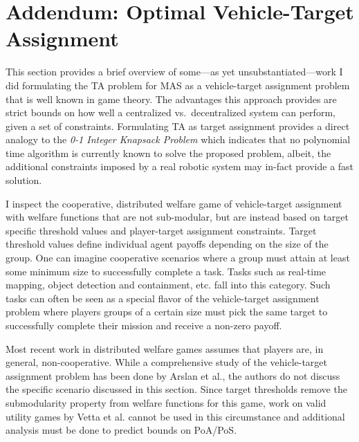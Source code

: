\documentclass[defaultstyle,12pt]{proposal}
\begin{document}
\chapter{\textbf{Addendum}: Optimal Vehicle-Target Assignment}
This section provides a brief overview of some---as yet unsubstantiated---work I did formulating the TA problem for MAS as a vehicle-target assignment problem that is well known in game theory. The advantages this approach provides are strict bounds on how well a centralized vs.~decentralized system can perform, given a set of constraints. Formulating TA as target assignment provides a direct analogy to the \emph{0-1 Integer Knapsack Problem} which indicates that no polynomial time algorithm is currently known to solve the proposed problem, albeit, the additional constraints imposed by a real robotic system may in-fact provide a fast solution.

I inspect the cooperative, distributed welfare game of vehicle-target assignment with welfare functions that are not sub-modular, but are instead based on target specific threshold values and player-target assignment constraints. Target threshold values define individual agent payoffs depending on the size of the group. One can imagine cooperative scenarios where a group must attain at least some minimum size to successfully complete a task. Tasks such as real-time mapping, object detection and containment, etc. fall into this category. Such tasks can often be seen as a special flavor of the vehicle-target assignment problem where players groups of a certain size  must pick the same target to successfully complete their mission and receive a non-zero payoff.

Most recent work in distributed welfare games\cite{Marden2008, Marden2013} assumes that players are, in general, non-cooperative. While a comprehensive study of the vehicle-target assignment problem has been done by Arslan et al.\cite{Arslan2007}, the authors do not discuss the specific scenario discussed in this section. Since target thresholds remove the submodularity property from welfare functions for this game, work on valid utility games by Vetta et al.\cite{Vetta2002} cannot be used in this circumstance and additional analysis must be done to predict bounds on PoA/PoS.
\end{document}
